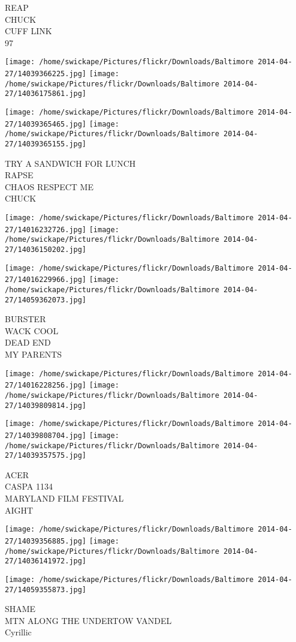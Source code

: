 \documentclass[10pt,letterpaper]{article}
\begin{document}
REAP\\
CHUCK\\
CUFF LINK\\
97\\
\pagebreak

\texttt{[image: /home/swickape/Pictures/flickr/Downloads/Baltimore 2014-04-27/14039366225.jpg]}
\texttt{[image: /home/swickape/Pictures/flickr/Downloads/Baltimore 2014-04-27/14036175861.jpg]}

\texttt{[image: /home/swickape/Pictures/flickr/Downloads/Baltimore 2014-04-27/14039365465.jpg]}
\texttt{[image: /home/swickape/Pictures/flickr/Downloads/Baltimore 2014-04-27/14039365155.jpg]}

TRY A SANDWICH FOR LUNCH\\
RAPSE\\
CHAOS RESPECT ME\\
CHUCK\\
\pagebreak

\texttt{[image: /home/swickape/Pictures/flickr/Downloads/Baltimore 2014-04-27/14016232726.jpg]}
\texttt{[image: /home/swickape/Pictures/flickr/Downloads/Baltimore 2014-04-27/14036150202.jpg]}

\texttt{[image: /home/swickape/Pictures/flickr/Downloads/Baltimore 2014-04-27/14016229966.jpg]}
\texttt{[image: /home/swickape/Pictures/flickr/Downloads/Baltimore 2014-04-27/14059362073.jpg]}

BURSTER\\
WACK COOL\\
DEAD END\\
MY PARENTS\\
\pagebreak

\texttt{[image: /home/swickape/Pictures/flickr/Downloads/Baltimore 2014-04-27/14016228256.jpg]}
\texttt{[image: /home/swickape/Pictures/flickr/Downloads/Baltimore 2014-04-27/14039809814.jpg]}

\texttt{[image: /home/swickape/Pictures/flickr/Downloads/Baltimore 2014-04-27/14039808704.jpg]}
\texttt{[image: /home/swickape/Pictures/flickr/Downloads/Baltimore 2014-04-27/14039357575.jpg]}

ACER\\
CASPA 1134\\
MARYLAND FILM FESTIVAL\\
AIGHT\\
\pagebreak

\texttt{[image: /home/swickape/Pictures/flickr/Downloads/Baltimore 2014-04-27/14039356885.jpg]}
\texttt{[image: /home/swickape/Pictures/flickr/Downloads/Baltimore 2014-04-27/14036141972.jpg]}

\texttt{[image: /home/swickape/Pictures/flickr/Downloads/Baltimore 2014-04-27/14059355873.jpg]}

SHAME\\
MTN ALONG THE UNDERTOW VANDEL\\
Cyrillic\\
\pagebreak
\end{document}
